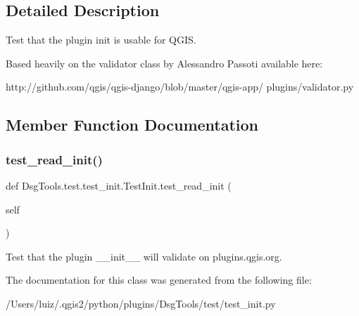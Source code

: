 \subsection{Detailed Description}
\begin{DoxyVerb}Test that the plugin init is usable for QGIS.

Based heavily on the validator class by Alessandro
Passoti available here:

http://github.com/qgis/qgis-django/blob/master/qgis-app/
         plugins/validator.py\end{DoxyVerb}
 

\subsection{Member Function Documentation}
\mbox{\label{class_dsg_tools_1_1test_1_1test__init_1_1_test_init_a95b5963fc0b5cc9e50df2adfbd5cd282}} 
\subsubsection{\texorpdfstring{test\+\_\+read\+\_\+init()}{test\_read\_init()}}
{\footnotesize\ttfamily def Dsg\+Tools.\+test.\+test\+\_\+init.\+Test\+Init.\+test\+\_\+read\+\_\+init (\begin{DoxyParamCaption}\item[{}]{self }\end{DoxyParamCaption})}

\begin{DoxyVerb}Test that the plugin __init__ will validate on plugins.qgis.org.\end{DoxyVerb}
 

The documentation for this class was generated from the following file\+:\begin{DoxyCompactItemize}
\item 
/\+Users/luiz/.\+qgis2/python/plugins/\+Dsg\+Tools/test/test\+\_\+init.\+py\end{DoxyCompactItemize}
